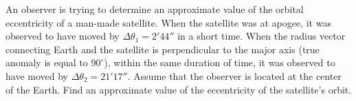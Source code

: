 An observer is trying to determine an approximate value of the orbital
eccentricity of a man-made satellite. When the satellite was at apogee, it was
observed to have moved by $\Delta\theta_1 = 2'44''$ in a short time. When the
radius vector connecting Earth and the satellite is perpendicular to the major
axis (true anomaly is equal to $90^\circ$), within the same duration of time,
it was observed to have moved by $\Delta\theta_2 = 21'17''$. Assume that the
observer is located at the center of the Earth. Find an approximate value of
the eccentricity of the satellite's orbit.
